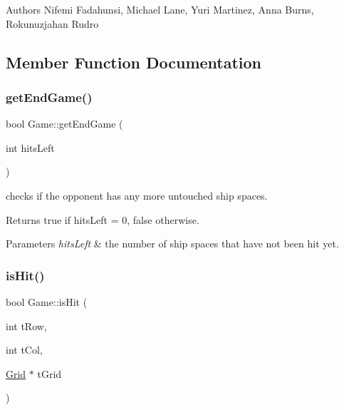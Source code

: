 \begin{DoxyAuthor}{Authors}
Nifemi Fadahunsi, Michael Lane, Yuri Martinez, Anna Burns, Rokunuzjahan Rudro 
\end{DoxyAuthor}


\subsection{Member Function Documentation}
\mbox{\label{classGame_ad71f679248bf79e4edd5b93d5985b098}} 
\subsubsection{\texorpdfstring{get\+End\+Game()}{getEndGame()}}
{\footnotesize\ttfamily bool Game\+::get\+End\+Game (\begin{DoxyParamCaption}\item[{int}]{hits\+Left }\end{DoxyParamCaption})}



checks if the opponent has any more untouched ship spaces. 

\begin{DoxyReturn}{Returns}
true if hits\+Left = 0, false otherwise. 
\end{DoxyReturn}

\begin{DoxyParams}{Parameters}
{\em hits\+Left} & the number of ship spaces that have not been hit yet. \\
\hline
\end{DoxyParams}
\mbox{\label{classGame_a44dd26e02329730028443a7ff28e1513}} 
\subsubsection{\texorpdfstring{is\+Hit()}{isHit()}}
{\footnotesize\ttfamily bool Game\+::is\+Hit (\begin{DoxyParamCaption}\item[{int}]{t\+Row,  }\item[{int}]{t\+Col,  }\item[{\hyperlink{classGrid}{Grid} $\ast$}]{t\+Grid }\end{DoxyParamCaption})}



